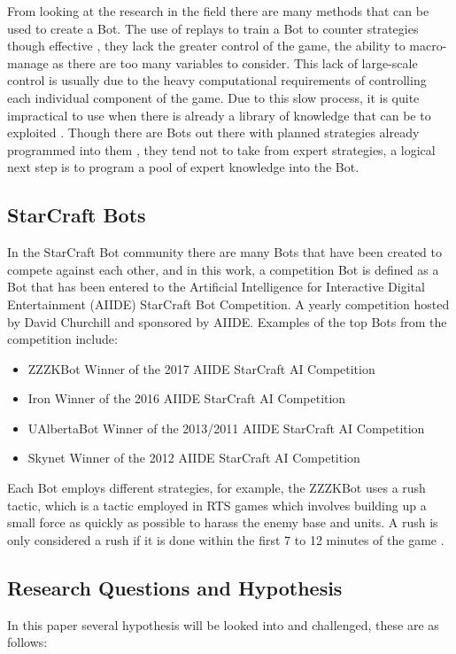 \documentclass[journal]{IEEEtran}
\begin{document}
	From looking at the research in the field there are many methods that can be used to create a Bot. The use of replays to train a Bot to counter strategies though effective \cite{Bayesian}, they lack the greater control of the game, the ability to macro-manage as there are too many variables to consider. This lack of large-scale control is usually due to the heavy computational requirements of controlling each individual component of the game. Due to this slow process, it is quite impractical to use when there is already a library of knowledge that can be to exploited \cite{Liquid}. Though there are Bots out there with planned strategies already programmed into them \cite{ZZZK,Fuzzy}, they tend not to take from expert strategies, a logical next step is to program a pool of expert knowledge into the Bot.
	
	\subsection{StarCraft Bots}
	In the StarCraft Bot community there are many Bots that have been created to compete against each other, and in this work, a competition Bot is defined as a Bot that has been entered to the Artificial Intelligence for Interactive Digital Entertainment (AIIDE) StarCraft Bot Competition. A yearly competition hosted by David Churchill and sponsored by AIIDE. Examples of the top Bots from the competition include:
	\begin{itemize}
		\item ZZZKBot Winner of the 2017 AIIDE StarCraft AI Competition \cite{ZZZK} 
		\item Iron Winner of the 2016 AIIDE StarCraft AI Competition \cite{Iron}
		\item UAlbertaBot Winner of the 2013/2011 AIIDE StarCraft AI Competition \cite{UAlberta}
		\item Skynet Winner of the 2012 AIIDE StarCraft AI Competition \cite{Skynet}
	\end{itemize}
	
	Each Bot employs different strategies, for example, the ZZZKBot uses a rush tactic, which is a tactic employed in RTS games which involves building up a small force as quickly as possible to harass the enemy base and units. A rush is only considered a rush if it is done within the first 7 to 12 minutes of the game \cite{Liqui}.
	
	\subsection{Research Questions and Hypothesis}
	In this paper several hypothesis will be looked into and challenged, these are as follows:
\end{document}
